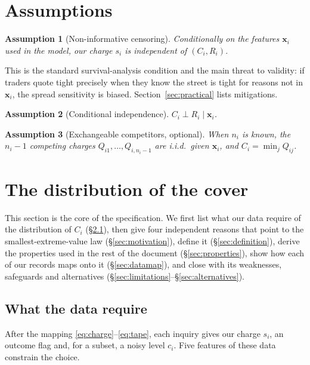 \documentclass[11pt,a4paper]{article}
\newtheorem{assumption}{Assumption}
\theoremstyle{definition}
\theoremstyle{remark}
\newcommand{\bx}{\bm{x}}
\begin{document}
\section{Assumptions}

\begin{assumption}[Non-informative censoring]\label{ass:censoring}
Conditionally on the features $\bx_i$ used in the model, our charge $s_i$ is independent of $(C_i,R_i)$.
\end{assumption}
This is the standard survival-analysis condition and the main threat to validity: if traders quote tight precisely when they know the street is tight for reasons not in $\bx_i$, the spread sensitivity is biased. Section~\ref{sec:practical} lists mitigations.

\begin{assumption}[Conditional independence]\label{ass:indep}
$C_i \perp R_i \mid \bx_i$.
\end{assumption}

\begin{assumption}[Exchangeable competitors, optional]\label{ass:iid}
When $n_i$ is known, the $n_i-1$ competing charges $Q_{i1},\dots,Q_{i,n_i-1}$ are i.i.d.\ given $\bx_i$, and $C_i=\min_j Q_{ij}$.
\end{assumption}

\section{The distribution of the cover}\label{sec:distribution}

This section is the core of the specification. We first list what our data require of the distribution of $C_i$ (\S\ref{sec:requirements}), then give four independent reasons that point to the smallest-extreme-value law (\S\ref{sec:motivation}), define it (\S\ref{sec:definition}), derive the properties used in the rest of the document (\S\ref{sec:properties}), show how each of our records maps onto it (\S\ref{sec:datamap}), and close with its weaknesses, safeguards and alternatives (\S\ref{sec:limitations}--\S\ref{sec:alternatives}).

\subsection{What the data require}\label{sec:requirements}
After the mapping \eqref{eq:charge}--\eqref{eq:tape}, each inquiry gives our charge $s_i$, an outcome flag and, for a subset, a noisy level $c_i$. Five features of these data constrain the choice.
\end{document}

